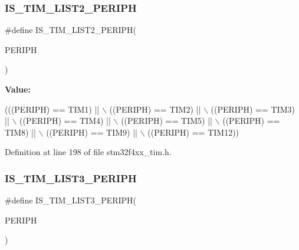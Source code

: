 \subsubsection{\texorpdfstring{I\+S\+\_\+\+T\+I\+M\+\_\+\+L\+I\+S\+T2\+\_\+\+P\+E\+R\+I\+PH}{IS\_TIM\_LIST2\_PERIPH}}
{\footnotesize\ttfamily \#define I\+S\+\_\+\+T\+I\+M\+\_\+\+L\+I\+S\+T2\+\_\+\+P\+E\+R\+I\+PH(\begin{DoxyParamCaption}\item[{}]{P\+E\+R\+I\+PH }\end{DoxyParamCaption})}

{\bfseries Value\+:}
\begin{DoxyCode}
(((PERIPH) == TIM1) || \(\backslash\)
                                     ((PERIPH) == TIM2) || \(\backslash\)
                                     ((PERIPH) == TIM3) || \(\backslash\)
                                     ((PERIPH) == TIM4) || \(\backslash\)
                                     ((PERIPH) == TIM5) || \(\backslash\)
                                     ((PERIPH) == TIM8) || \(\backslash\)
                                     ((PERIPH) == TIM9) || \(\backslash\)
                                     ((PERIPH) == TIM12))
\end{DoxyCode}


Definition at line 198 of file stm32f4xx\+\_\+tim.\+h.

\mbox{\label{group___t_i_m___exported__constants_ga2d80541c542755ac3f2aca078bd98adb}} 
\subsubsection{\texorpdfstring{I\+S\+\_\+\+T\+I\+M\+\_\+\+L\+I\+S\+T3\+\_\+\+P\+E\+R\+I\+PH}{IS\_TIM\_LIST3\_PERIPH}}
{\footnotesize\ttfamily \#define I\+S\+\_\+\+T\+I\+M\+\_\+\+L\+I\+S\+T3\+\_\+\+P\+E\+R\+I\+PH(\begin{DoxyParamCaption}\item[{}]{P\+E\+R\+I\+PH }\end{DoxyParamCaption})}

